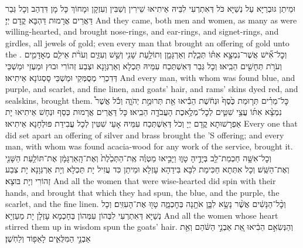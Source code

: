 {וּמֵיתַן גּוּבְרַיָּא עַל נְשַׁיָּא כֹּל דְּאִתְרְעִי לִבֵּיהּ אֵיתִיאוּ שֵׁירִין וְשַׁבִּין וְעִזְקָן וּמָחוֹךְ כָּל מָן דִּדְהַב וְכָל גְּבַר דַּאֲרֵים אֲרָמוּת דַּהְבָּא קֳדָם יְיָ׃}
{And they came, both men and women, as many as were willing-hearted, and brought nose-rings, and ear-rings, and signet-rings, and girdles, all jewels of gold; even every man that brought an offering of gold unto the \lord.}{}
{וְכׇל־אִ֞ישׁ אֲשֶׁר־נִמְצָ֣א אִתּ֗וֹ תְּכֵ֧לֶת וְאַרְגָּמָ֛ן וְתוֹלַ֥עַת שָׁנִ֖י וְשֵׁ֣שׁ וְעִזִּ֑ים וְעֹרֹ֨ת אֵילִ֧ם מְאׇדָּמִ֛ים וְעֹרֹ֥ת תְּחָשִׁ֖ים הֵבִֽיאוּ׃
}
{וְכָל גְּבַר דְּאִשְׁתְּכַח עִמֵּיהּ תַּכְלָא וְאַרְגְּוָנָא וּצְבַע זְהוֹרִי וּבוּץ וּמַעְזֵי וּמַשְׁכֵּי דְּדִכְרֵי מְסֻמְּקֵי וּמַשְׁכֵּי סָסְגוֹנָא אֵיתִיאוּ׃}
{And every man, with whom was found blue, and purple, and scarlet, and fine linen, and goats’ hair, and rams’ skins dyed red, and sealskins, brought them.}{}
{כׇּל־מֵרִ֗ים תְּר֤וּמַת כֶּ֙סֶף֙ וּנְחֹ֔שֶׁת הֵבִ֕יאוּ אֵ֖ת תְּרוּמַ֣ת יְהֹוָ֑ה וְכֹ֡ל אֲשֶׁר֩ נִמְצָ֨א אִתּ֜וֹ עֲצֵ֥י שִׁטִּ֛ים לְכׇל־מְלֶ֥אכֶת הָעֲבֹדָ֖ה הֵבִֽיאוּ׃}
{כָּל דַּאֲרֵים אֲרָמוּת כְּסַף וּנְחָשׁ אֵיתִיאוּ יָת אַפְרָשׁוּתָא קֳדָם יְיָ וְכֹל דְּאִשְׁתְּכַח עִמֵּיהּ אָעֵי שִׁטִּין לְכָל עֲבִידַת פּוּלְחָנָא אֵיתִיאוּ׃}
{Every one that did set apart an offering of silver and brass brought the \lord’S offering; and every man, with whom was found acacia-wood for any work of the service, brought it.}{}
{וְכׇל־אִשָּׁ֥ה חַכְמַת־לֵ֖ב בְּיָדֶ֣יהָ טָו֑וּ וַיָּבִ֣יאוּ מַטְוֶ֗ה אֶֽת־הַתְּכֵ֙לֶת֙ וְאֶת־הָֽאַרְגָּמָ֔ן אֶת־תּוֹלַ֥עַת הַשָּׁנִ֖י וְאֶת־הַשֵּֽׁשׁ׃}
{וְכָל אִתְּתָא חַכִּימַת לִבָּא בִּידַהָא עָזְלָא וּמֵיתַן כִּד עֲזִיל יָת תַּכְלָא וְיָת אַרְגְּוָנָא יָת צְבַע זְהוֹרִי וְיָת בּוּצָא׃}
{And all the women that were wise-hearted did spin with their hands, and brought that which they had spun, the blue, and the purple, the scarlet, and the fine linen.}{}
{וְכׇ֨ל־הַנָּשִׁ֔ים אֲשֶׁ֨ר נָשָׂ֥א לִבָּ֛ן אֹתָ֖נָה בְּחׇכְמָ֑ה טָו֖וּ אֶת־הָעִזִּֽים׃
}
{וְכָל נְשַׁיָּא דְּאִתְרְעִי לִבְּהוֹן עִמְּהוֹן בְּחָכְמָא עָזְלָן יָת מַעַזְיָא׃}
{And all the women whose heart stirred them up in wisdom spun the goats’ hair.}{}
{וְהַנְּשִׂאִ֣ם הֵבִ֔יאוּ אֵ֚ת אַבְנֵ֣י הַשֹּׁ֔הַם וְאֵ֖ת אַבְנֵ֣י הַמִּלֻּאִ֑ים לָאֵפ֖וֹד וְלַחֹֽשֶׁן׃
}

